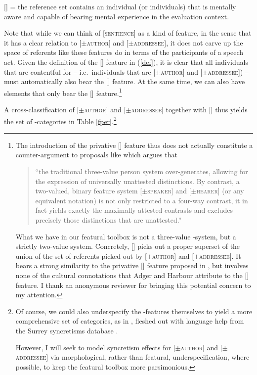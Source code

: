 \documentclass[output=paper, modfonts, nonflat]{langsci/langscibook}
\begin{document}
\ex \textsc{[\sentience]} = the reference set contains an individual (or
individuals) that is mentally aware and capable of bearing mental
experience in the evaluation context.  \z \z


\noindent Note that while we can think of [\textsc{sentience}] as a kind of \person{}
feature, in the sense that it has a clear relation to [$\pm$\textsc{author}]
and [$\pm$\textsc{addressee}], it does not carve up the space of referents like
these features do in terms of the participants of a speech
act. Given the definition of the [\sentience] feature in (\ref{def}),
it is clear that all individuals that are contentful for \person{} --
i.e.\ individuals that are [$\pm$\textsc{author}] and [$\pm$\textsc{addressee}]) --
must automatically also bear the [\sentience] feature. At the same
time, we can also have elements that only bear the [\sentience]
feature.\footnote{The introduction of the privative [\sentience]
  feature thus does not actually constitute a counter-argument to
  proposals like \citet[4]{bobaljik:2008a} which argues that \begin{quotation}``the
  traditional three-value person system over-generates, allowing for
  the expression of universally unattested distinctions. By contrast,
  a two-valued, binary feature system [$\pm$\textsc{speaker}] and [$\pm$\textsc{hearer}]
  (or any equivalent notation) is not only restricted to a four-way
  contrast, it in fact yields exactly the maximally attested contrasts
  and excludes precisely those distinctions that are unattested.''\end{quotation} What we have in our featural toolbox is not a three-value
  \person-system, but a strictly two-value \person{}
  system. Concretely, [\sentience] picks out a proper superset of the
  union of the set of referents picked out by [$\pm$\textsc{author}] and
  [$\pm$\textsc{addressee}].  It bears a strong similarity to the privative
  [\empathy] feature proposed in \citet{adgerharbour:2007}, but
  involves none of the cultural connotations that Adger and Harbour
  attribute to the [\empathy] feature. I thank an anonymous reviewer
  for bringing this potential concern to my attention.} %

A cross-classification of [$\pm$\textsc{author}] and [$\pm$\textsc{addressee}] together
with [\sentience] thus yields the set of \person-categories in Table
\ref{fper}.\footnote{Of course, we could also underspecify the
  \person-features themselves to yield a more comprehensive set of
  categories, as in , fleshed out with language help
  from the Surrey syncretisms database \citep{surrey:2002}.

However, I will seek to model syncretism effects for [$\pm$\textsc{author}] and [$\pm$\textsc{addressee}] via morphological, rather than
featural, underspecification, where possible, to keep the
featural toolbox more parsimonious.}
 
\end{document}
